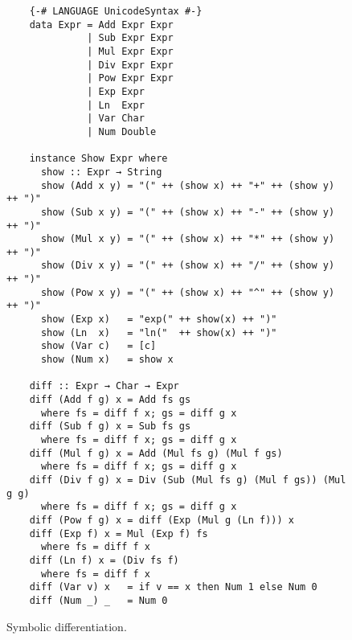\begin{figure}[!ht]
\centering
\begin{verbatim}
    {-# LANGUAGE UnicodeSyntax #-}
    data Expr = Add Expr Expr
              | Sub Expr Expr
              | Mul Expr Expr
              | Div Expr Expr
              | Pow Expr Expr
              | Exp Expr
              | Ln  Expr
              | Var Char
              | Num Double
    
    instance Show Expr where
      show :: Expr → String          
      show (Add x y) = "(" ++ (show x) ++ "+" ++ (show y) ++ ")"
      show (Sub x y) = "(" ++ (show x) ++ "-" ++ (show y) ++ ")"
      show (Mul x y) = "(" ++ (show x) ++ "*" ++ (show y) ++ ")"
      show (Div x y) = "(" ++ (show x) ++ "/" ++ (show y) ++ ")"
      show (Pow x y) = "(" ++ (show x) ++ "^" ++ (show y) ++ ")"
      show (Exp x)   = "exp(" ++ show(x) ++ ")"
      show (Ln  x)   = "ln("  ++ show(x) ++ ")"
      show (Var c)   = [c]
      show (Num x)   = show x
    
    diff :: Expr → Char → Expr
    diff (Add f g) x = Add fs gs
      where fs = diff f x; gs = diff g x
    diff (Sub f g) x = Sub fs gs
      where fs = diff f x; gs = diff g x
    diff (Mul f g) x = Add (Mul fs g) (Mul f gs)
      where fs = diff f x; gs = diff g x
    diff (Div f g) x = Div (Sub (Mul fs g) (Mul f gs)) (Mul g g)
      where fs = diff f x; gs = diff g x
    diff (Pow f g) x = diff (Exp (Mul g (Ln f))) x 
    diff (Exp f) x = Mul (Exp f) fs
      where fs = diff f x
    diff (Ln f) x = (Div fs f)
      where fs = diff f x
    diff (Var v) x   = if v == x then Num 1 else Num 0
    diff (Num _) _   = Num 0
\end{verbatim}
\vspace*{-0.3cm}
\caption{Symbolic differentiation.}
\label{fig:differentiate.hs}
\end{figure}








